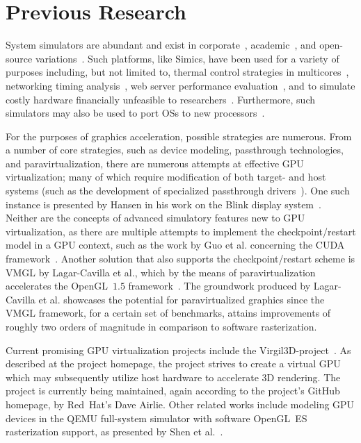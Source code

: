 
\section{Previous Research}
\label{sec:previousresearch}

System simulators are abundant and exist in corporate~, academic~, and open-source variations~.
Such platforms, like Simics, have been used for a variety of purposes including, but not limited to, thermal control strategies in multicores~, networking timing analysis~, web server performance evaluation~, and to simulate costly hardware financially unfeasible to researchers~.
Furthermore, such simulators may also be used to port OSs to new processors~.

For the purposes of graphics acceleration, possible strategies are numerous.
From a number of core strategies, such as device modeling, passthrough technologies, and paravirtualization, there are numerous attempts at effective GPU virtualization; many of which require modification of both target- and host systems (such as the development of specialized passthrough drivers~).
One such instance is presented by Hansen in his work on the Blink display system~.
Neither are the concepts of advanced simulatory features new to GPU virtualization, as there are multiple attempts to implement the checkpoint/restart model in a GPU context, such as the work by Guo et al. concerning the CUDA framework~.
Another solution that also supports the checkpoint/restart scheme is VMGL by Lagar-Cavilla et al., which by the means of paravirtualization accelerates the OpenGL~$1.5$ framework~.
The groundwork produced by Lagar-Cavilla et al. showcases the potential for paravirtualized graphics since the VMGL framework, for a certain set of benchmarks, attains improvements of roughly two orders of magnitude in comparison to software rasterization.

Current promising GPU virtualization projects include the Virgil3D-project~.
As described at the project homepage, the project strives to create a virtual GPU which may subsequently utilize host hardware to accelerate 3D rendering.
The project is currently being maintained, again according to the project's GitHub homepage, by Red~Hat's Dave Airlie.
Other related works include modeling GPU devices in the QEMU full-system simulator with software OpenGL~ES rasterization support, as presented by Shen et al.~.

